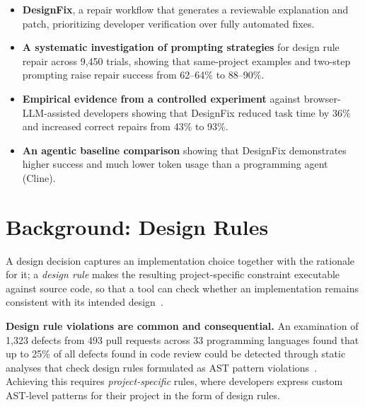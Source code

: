 \begin{itemize}
\item \textbf{DesignFix}, a repair workflow that
generates a reviewable
explanation and patch, prioritizing developer verification over fully automated fixes.

\item \textbf{A systematic investigation of prompting strategies} for design rule repair across 9,450 trials, showing that same-project examples and two-step prompting raise repair success from 62--64\% to 88--90\%. 

\item \textbf{Empirical evidence from a controlled experiment} against browser-LLM-assisted developers showing that DesignFix reduced task time by 36\% and increased correct
repairs from 43\% to 93\%.

\item \textbf{An agentic baseline comparison} showing that DesignFix demonstrates higher success and much lower token usage than a programming agent (Cline).
\end{itemize}


\section{Background: Design Rules}
\label{sec:background}

A design decision captures an implementation choice together with the
rationale for it; a \emph{design rule} makes the resulting
project-specific constraint executable against source code, so that a
tool can check whether an implementation remains consistent with its
intended design~\cite{mehrpour2019active,mehrpour2020rulepad}.

\textbf{Design rule violations are common and consequential.} 
An examination of 1,323 defects from 493 pull requests across 33 programming languages found that up to 25\% of all defects found in code review could be detected through static analyses that check design rules formulated as AST pattern violations~\cite{mehrpour2023canstatic}. Achieving this requires \emph{project-specific}
rules, where developers express custom
AST-level patterns for their project in the form of design rules.

